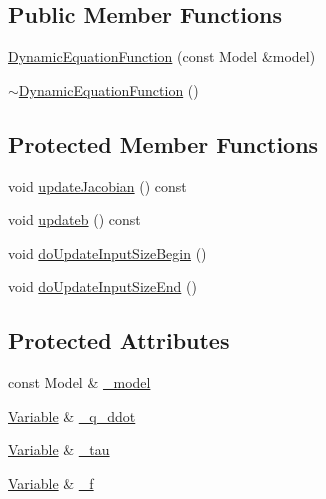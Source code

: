 \subsection*{Public Member Functions}
\begin{DoxyCompactItemize}
\item 
\hyperlink{classocra_1_1DynamicEquationFunction_ab6a38098b1aac7db298e0f3a93955624}{Dynamic\+Equation\+Function} (const Model \&model)
\item 
\hyperlink{classocra_1_1DynamicEquationFunction_a84c82f21c1564aaca6b5aa703ecae73e}{$\sim$\+Dynamic\+Equation\+Function} ()
\end{DoxyCompactItemize}
\subsection*{Protected Member Functions}
\begin{DoxyCompactItemize}
\item 
void \hyperlink{classocra_1_1DynamicEquationFunction_a81d71c87d0f52b3d321614c6219022ad}{update\+Jacobian} () const
\item 
void \hyperlink{classocra_1_1DynamicEquationFunction_ae1fe835a481f5f0bde6c8b0fa8ea09b2}{updateb} () const
\item 
void \hyperlink{classocra_1_1DynamicEquationFunction_a6fc52fcd947fa303e55729dbb286b92c}{do\+Update\+Input\+Size\+Begin} ()
\item 
void \hyperlink{classocra_1_1DynamicEquationFunction_a8d20f6ed1e3983d1fddf648729eba955}{do\+Update\+Input\+Size\+End} ()
\end{DoxyCompactItemize}
\subsection*{Protected Attributes}
\begin{DoxyCompactItemize}
\item 
const Model \& \hyperlink{classocra_1_1DynamicEquationFunction_ad0c5d639974a97aa3ed3f0bbe0f8189d}{\+\_\+model}
\item 
\hyperlink{classocra_1_1Variable}{Variable} \& \hyperlink{classocra_1_1DynamicEquationFunction_a8a6dfb64fcca3c42a9e7ad637706a6cc}{\+\_\+q\+\_\+ddot}
\item 
\hyperlink{classocra_1_1Variable}{Variable} \& \hyperlink{classocra_1_1DynamicEquationFunction_a60ba636a9028046969c5491ec7ed2f9e}{\+\_\+tau}
\item 
\hyperlink{classocra_1_1Variable}{Variable} \& \hyperlink{classocra_1_1DynamicEquationFunction_a70499af5c86e68836acb7251b37ab668}{\+\_\+f}
\end{DoxyCompactItemize}
